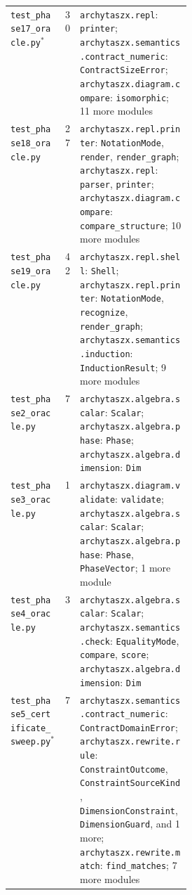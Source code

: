 \begin{xltabular}{\linewidth}{@{}>{\raggedright\arraybackslash}p{0.3\linewidth}r>{\raggedright\arraybackslash}X@{}}
\texttt{test\_\allowbreak{}phase17\_\allowbreak{}oracle.py}$^{\ast}$ & 30 & \texttt{archytaszx.\allowbreak{}repl}: \texttt{printer}; \texttt{archytaszx.\allowbreak{}semantics.\allowbreak{}contract\_\allowbreak{}numeric}: \texttt{ContractSizeError}; \texttt{archytaszx.\allowbreak{}diagram.\allowbreak{}compare}: \texttt{isomorphic}; 11 more modules \\
\texttt{test\_\allowbreak{}phase18\_\allowbreak{}oracle.py} & 27 & \texttt{archytaszx.\allowbreak{}repl.\allowbreak{}printer}: \texttt{NotationMode}, \texttt{render}, \texttt{render\_\allowbreak{}graph}; \texttt{archytaszx.\allowbreak{}repl}: \texttt{parser}, \texttt{printer}; \texttt{archytaszx.\allowbreak{}diagram.\allowbreak{}compare}: \texttt{compare\_\allowbreak{}structure}; 10 more modules \\
\texttt{test\_\allowbreak{}phase19\_\allowbreak{}oracle.py} & 42 & \texttt{archytaszx.\allowbreak{}repl.\allowbreak{}shell}: \texttt{Shell}; \texttt{archytaszx.\allowbreak{}repl.\allowbreak{}printer}: \texttt{NotationMode}, \texttt{recognize}, \texttt{render\_\allowbreak{}graph}; \texttt{archytaszx.\allowbreak{}semantics.\allowbreak{}induction}: \texttt{InductionResult}; 9 more modules \\
\texttt{test\_\allowbreak{}phase2\_\allowbreak{}oracle.py} & 7 & \texttt{archytaszx.\allowbreak{}algebra.\allowbreak{}scalar}: \texttt{Scalar}; \texttt{archytaszx.\allowbreak{}algebra.\allowbreak{}phase}: \texttt{Phase}; \texttt{archytaszx.\allowbreak{}algebra.\allowbreak{}dimension}: \texttt{Dim} \\
\texttt{test\_\allowbreak{}phase3\_\allowbreak{}oracle.py} & 1 & \texttt{archytaszx.\allowbreak{}diagram.\allowbreak{}validate}: \texttt{validate}; \texttt{archytaszx.\allowbreak{}algebra.\allowbreak{}scalar}: \texttt{Scalar}; \texttt{archytaszx.\allowbreak{}algebra.\allowbreak{}phase}: \texttt{Phase}, \texttt{PhaseVector}; 1 more module \\
\texttt{test\_\allowbreak{}phase4\_\allowbreak{}oracle.py} & 3 & \texttt{archytaszx.\allowbreak{}algebra.\allowbreak{}scalar}: \texttt{Scalar}; \texttt{archytaszx.\allowbreak{}semantics.\allowbreak{}check}: \texttt{EqualityMode}, \texttt{compare}, \texttt{score}; \texttt{archytaszx.\allowbreak{}algebra.\allowbreak{}dimension}: \texttt{Dim} \\
\texttt{test\_\allowbreak{}phase5\_\allowbreak{}certificate\_\allowbreak{}sweep.py}$^{\ast}$ & 7 & \texttt{archytaszx.\allowbreak{}semantics.\allowbreak{}contract\_\allowbreak{}numeric}: \texttt{ContractDomainError}; \texttt{archytaszx.\allowbreak{}rewrite.\allowbreak{}rule}: \texttt{ConstraintOutcome}, \texttt{ConstraintSourceKind}, \texttt{DimensionConstraint}, \texttt{DimensionGuard}, and 1 more; \texttt{archytaszx.\allowbreak{}rewrite.\allowbreak{}match}: \texttt{find\_\allowbreak{}matches}; 7 more modules \\

\end{xltabular}
